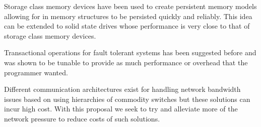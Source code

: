 \documentclass[letterpaper,12pt]{article}
\begin{document}
Storage class memory devices have been used to create persistent
memory models allowing for in memory structures to be persisted
quickly and reliably\cite{Mnemosyne}. This idea can be extended to
solid state drives whose performance is very close to that of storage
class memory devices.

Transactional operations for fault tolerant systems has been suggested
before and was shown to be tunable to provide as much performance or
overhead that the programmer wanted\cite{FaulTM}.

Different communication architectures exist for handling network
bandwidth issues based on using hierarchies of commodity switches but
these solutions can incur high cost\cite{Network}. With this proposal
we seek to try and alleviate more of the network pressure to reduce
costs of such solutions.




\end{document}
